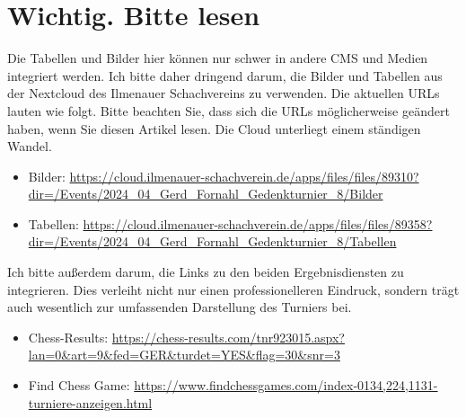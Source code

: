 \documentclass[a4paper,ngerman]{tui-algo-seminar}
\title{\inhalt}
\author{Erik Skopp}
\begin{document}
\maketitle
\thispagestyle{plain} %
\begin{abstract}
Das Gerd-Fornahl-Gedenkturnier ehrt den einst führenden Spieler und Trainer des Ilmenauer Schachvereins und ist ein jährliches Event, das sein Vermächtnis in der Schachgemeinschaft fortleben lässt. Das 8. Turnier präsentierte eine vielfältige Teilnehmermischung, was für spannende Partien sorgte. Die erfolgreiche Durchführung wurde durch die Zusammenarbeit des Ilmenauer Schachvereins und des Vereins für Kulturelle Koordinierung ermöglicht. Trotz einiger Überraschungen bleibt die Atmosphäre des Turniers geprägt von Fairness, Leidenschaft und dem Geist des Schachs.
\end{abstract}

\tableofcontents 
\clearpage
\section{Wichtig. Bitte lesen}

Die Tabellen und Bilder hier können nur schwer in andere CMS und Medien integriert werden. Ich bitte daher dringend darum, die Bilder und Tabellen aus der Nextcloud des Ilmenauer Schachvereins zu verwenden. Die aktuellen URLs lauten wie folgt. Bitte beachten Sie, dass sich die URLs möglicherweise geändert haben, wenn Sie diesen Artikel lesen. Die Cloud unterliegt einem ständigen Wandel.
\begin{itemize}
    \item Bilder: \url{https://cloud.ilmenauer-schachverein.de/apps/files/files/89310?dir=/Events/2024_04_Gerd_Fornahl_Gedenkturnier_8/Bilder}
    \item Tabellen: \url{https://cloud.ilmenauer-schachverein.de/apps/files/files/89358?dir=/Events/2024_04_Gerd_Fornahl_Gedenkturnier_8/Tabellen}
\end{itemize}

Ich bitte außerdem darum, die Links zu den beiden Ergebnisdiensten zu integrieren. Dies verleiht nicht nur einen professionelleren Eindruck, sondern trägt auch wesentlich zur umfassenden Darstellung des Turniers bei.

\begin{itemize}
    \item Chess-Results: \url{https://chess-results.com/tnr923015.aspx?lan=0&art=9&fed=GER&turdet=YES&flag=30&snr=3}
     \item Find Chess Game: \url{https://www.findchessgames.com/index-0134,224,1131-turniere-anzeigen.html}
\end{itemize}
\clearpage
\end{document}
